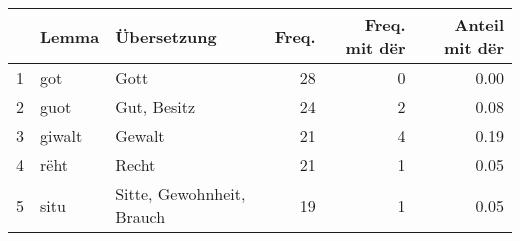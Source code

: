 \begin{tabular}{rllrrr}
  \hline
 & Lemma & Übersetzung & Freq. & Freq. mit dër & Anteil mit dër \\ 
  \hline
1 & got & Gott &  28 &   0 & 0.00 \\ 
  2 & guot & Gut, Besitz &  24 &   2 & 0.08 \\ 
  3 & giwalt & Gewalt &  21 &   4 & 0.19 \\ 
  4 & rëht & Recht &  21 &   1 & 0.05 \\ 
  5 & situ & Sitte, Gewohnheit, Brauch &  19 &   1 & 0.05 \\ 
   \hline
\end{tabular}
